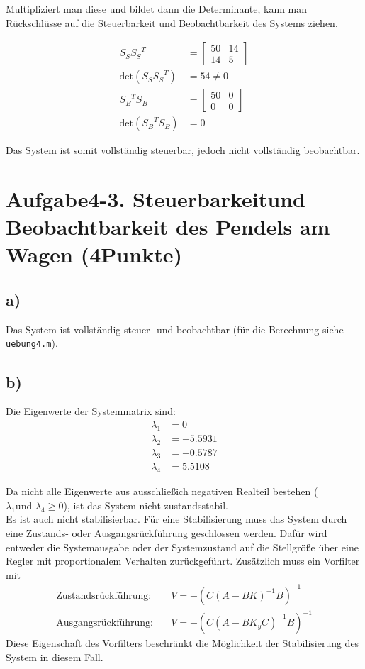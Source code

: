 \documentclass[11pt]{scrartcl} %
\begin{document}
Multipliziert man diese und bildet dann die Determinante, kann man Rückschlüsse auf die Steuerbarkeit und Beobachtbarkeit des Systems ziehen.

\begin{align*}
S_S{S_S}^T&=\begin{bmatrix}
50 & 14\\
14 & 5
\end{bmatrix}\\
\text{det}\left( S_S{S_S}^T \right) &= 54 \neq 0\\
{S_B}^TS_B&=\begin{bmatrix}
50 & 0\\
0 & 0
\end{bmatrix}\\
\text{det}\left( {S_B}^TS_B \right) &= 0
\end{align*}

Das System ist somit vollständig steuerbar, jedoch nicht vollständig beobachtbar.


\section*{Aufgabe4-3. Steuerbarkeitund Beobachtbarkeit des Pendels am Wagen (4Punkte)}
\subsection*{a)}
Das System ist vollständig steuer- und beobachtbar (für die Berechnung siehe \verb+uebung4.m+).

\subsection*{b)}
Die Eigenwerte der Systemmatrix sind:
\begin{align*}
\lambda_1 &= 0\\
\lambda_2 &= -5.5931\\
\lambda_3 &= -0.5787\\
\lambda_4 &= 5.5108
\end{align*}

Da nicht alle Eigenwerte aus ausschließich negativen Realteil bestehen ($\lambda_1 \text{und } \lambda_4 \geq 0$), ist das System nicht zustandsstabil.\\
Es ist auch nicht stabilisierbar. Für eine Stabilisierung muss das System durch eine Zustands- oder Ausgangsrückführung geschlossen werden. Dafür wird entweder die Systemausgabe oder der Systemzustand auf die Stellgröße über eine Regler mit proportionalem Verhalten zurückgeführt. Zusätzlich muss ein Vorfilter mit
\begin{align*}
\text{Zustandsrückführung:} \quad & V=-\left( C \left( A-BK \right)^{-1}B \right)^{-1}\\
\text{Ausgangsrückführung:} \quad & V=-\left( C \left( A-BK_yC \right)^{-1}B \right)^{-1}
\end{align*}
Diese Eigenschaft des Vorfilters beschränkt die Möglichkeit der Stabilisierung des System in diesem Fall.\\
\end{document}
